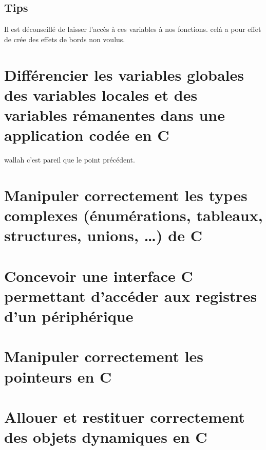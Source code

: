 \subsection{Tips}

Il est déconseillé de laisser l'accès à ces variables à nos fonctions. celà a pour effet de crée des effets de bords non voulus.






\section{Différencier les variables globales des variables locales et des variables
rémanentes dans une application codée en C}

wallah c'est pareil que le point précédent.











\section{Manipuler correctement les types complexes (énumérations, tableaux, structures,
unions, …) de C}











\section{Concevoir une interface C permettant d’accéder aux registres d’un périphérique}
    








\section{Manipuler correctement les pointeurs en C}






\section{Allouer et restituer correctement des objets dynamiques en C}
 







